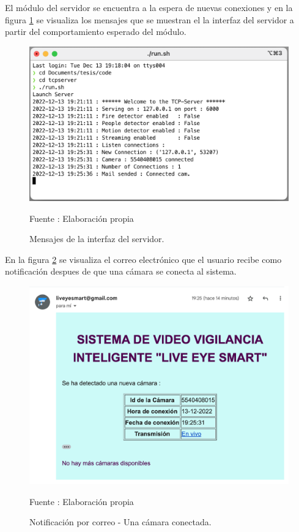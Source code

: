 El módulo del servidor se encuentra a la espera de nuevas conexiones y en la figura \ref{camera_connected_one_camera} se visualiza los mensajes que se muestran el la interfaz del servidor a partir del comportamiento esperado del módulo.\\

\begin{figure}[H]
    \begin{center}
        \includegraphics[width=13cm]{img/capitulo_6/server_cam_connected.png}
    \end{center}
    \begin{center}
        \caption{Mensajes de la interfaz del servidor.}
        Fuente : Elaboración propia
        \label{camera_connected_one_camera}
    \end{center}
\end{figure}

En la figura \ref{mail_one_camera_connected} se visualiza el correo electrónico que el usuario recibe como notificación despues de que una cámara se conecta al sistema.\\

\begin{figure}[H]
    \begin{center}
        \includegraphics[width=12cm]{img/capitulo_6/mail1.png}
    \end{center}
    \begin{center}
        \caption{Notificación por correo - Una cámara conectada.}
        Fuente : Elaboración propia
        \label{mail_one_camera_connected}
    \end{center}
\end{figure}

